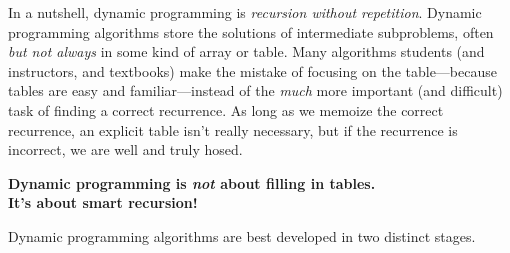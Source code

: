 In a nutshell, dynamic programming is \textit{recursion without repetition}.
Dynamic programming algorithms store the solutions of intermediate subproblems, often \textit{but not always} in some kind of array or table.
Many algorithms students (and instructors, and textbooks) make the mistake of focusing on the table---because tables are easy and familiar---instead of the \textit{much} more important (and difficult) task of finding a correct recurrence.
As long as we memoize the correct recurrence, an explicit table isn’t really necessary, but if the recurrence is incorrect, we are well and truly hosed.
\begin{problembox}
{\centering\color{JEred}\sffamily\bfseries\large Dynamic programming is \textit{not} about filling in tables.\\ It’s about smart recursion!\par}
\end{problembox}
Dynamic programming algorithms are best developed in two distinct stages.

